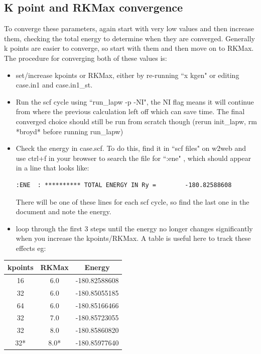 \documentclass[12pt]{article}
\begin{document}
\subsection{K point and RKMax convergence}

To converge these parameters, again start with very low values and then increase them, checking the total energy to determine when they are converged.  Generally k points are easier to converge, so start with them and then move on to RKMax. The procedure for converging both of these values is:

\begin{itemize}
	\item set/increase kpoints or RKMax, either by re-running ``x kgen" or editing case.in1 and case.in1\_st.
	
	\item Run the scf cycle using ``run\_lapw -p -NI", the NI flag means it will continue from where the previous calculation left off which can save time. The final converged choice should still be run from scratch though (rerun init\_lapw, rm *broyd* before running run\_lapw)
	
	\item Check the energy in case.scf.  To do this, find it in ``scf files" on w2web and use ctrl+f in your browser to search the file for ``:ene" , which should appear in a line that looks like: 
	
		\begin{lstlisting}
:ENE  : ********** TOTAL ENERGY IN Ry =        -180.82588608
		\end{lstlisting}
	
	There will be one of these lines for each scf cycle, so find the last one in the document and note the energy. 
	
	
	\item loop through the first 3 steps until the energy no longer changes significantly when you increase the kpoints/RKMax.  A table is useful here to track these effects eg:
	
\end{itemize}

\begin{table}[H]
	\centering
\begin{tabular}{ccc}

			kpoints & RKMax & Energy \\
			\hline
			16 & 6.0 & -180.82588608\\
			32 & 6.0 & -180.85055185\\
			64 & 6.0 & -180.85166466\\
			32 & 7.0 & -180.85723055\\
			32 & 8.0 & -180.85860820\\
			32* & 8.0* & -180.85977640\\
			
			

\end{tabular}

\end{table}
\end{document}
